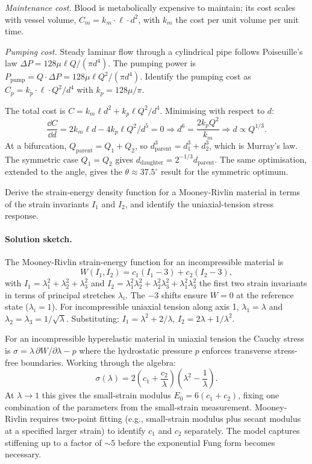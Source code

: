 \emph{Maintenance cost.} Blood is metabolically expensive to
maintain; its cost scales with vessel volume,
$C_m = k_m \cdot \ell \cdot d^2$, with $k_m$ the cost per unit
volume per unit time.

\emph{Pumping cost.} Steady laminar flow through a cylindrical pipe
follows Poiseuille's law $\Delta P = 128 \mu \ell Q / (\pi d^4)$.
The pumping power is $P_{\text{pump}} = Q \cdot \Delta P =
128 \mu \ell Q^2 / (\pi d^4)$. Identify the pumping cost as
$C_p = k_p \cdot \ell \cdot Q^2 / d^4$ with $k_p = 128 \mu / \pi$.

The total cost is $C = k_m \ell d^2 + k_p \ell Q^2 / d^4$.
Minimising with respect to $d$:
\[
\frac{\dd C}{\dd d} = 2 k_m \ell d - 4 k_p \ell Q^2 / d^5 = 0
\Rightarrow d^6 = \frac{2 k_p Q^2}{k_m}
\Rightarrow d \propto Q^{1/3}.
\]
At a bifurcation, $Q_{\text{parent}} = Q_1 + Q_2$, so
$d_{\text{parent}}^3 = d_1^3 + d_2^3$, which is Murray's law. The
symmetric case $Q_1 = Q_2$ gives
$d_{\text{daughter}} = 2^{-1/3} d_{\text{parent}}$. The same
optimisation, extended to the angle, gives the
$\theta \approx 37.5^{\circ}$ result for the symmetric optimum.

\begin{exercise}
Derive the strain-energy density function for a Mooney-Rivlin
material in terms of the strain invariants $I_1$ and $I_2$, and
identify the uniaxial-tension stress response.
\end{exercise}

\paragraph{Solution sketch.} The Mooney-Rivlin strain-energy
function for an incompressible material is
\[
W(I_1, I_2) = c_1 (I_1 - 3) + c_2 (I_2 - 3),
\]
with $I_1 = \lambda_1^2 + \lambda_2^2 + \lambda_3^2$ and
$I_2 = \lambda_1^2\lambda_2^2 + \lambda_2^2\lambda_3^2
       + \lambda_1^2\lambda_3^2$ the first two strain invariants in
terms of principal stretches $\lambda_i$. The $-3$ shifts ensure
$W = 0$ at the reference state ($\lambda_i = 1$). For
incompressible uniaxial tension along axis 1, $\lambda_1 = \lambda$
and $\lambda_2 = \lambda_3 = 1/\sqrt{\lambda}$. Substituting:
$I_1 = \lambda^2 + 2/\lambda$,
$I_2 = 2\lambda + 1/\lambda^2$.

For an incompressible hyperelastic material in uniaxial tension the
Cauchy stress is
$\sigma = \lambda \,\partial W / \partial \lambda
       - p$
where the hydrostatic pressure $p$ enforces transverse stress-free
boundaries. Working through the algebra:
\[
\sigma(\lambda) = 2\!\left(c_1 + \frac{c_2}{\lambda}\right)
                  \!\left(\lambda^2 - \frac{1}{\lambda}\right).
\]
At $\lambda \to 1$ this gives the small-strain modulus $E_0 =
6(c_1 + c_2)$, fixing one combination of the parameters from the
small-strain measurement. Mooney-Rivlin requires two-point fitting
(e.g., small-strain modulus plus secant modulus at a specified
larger strain) to identify $c_1$ and $c_2$ separately. The model
captures stiffening up to a factor of $\sim 5$ before the
exponential Fung form becomes necessary.


